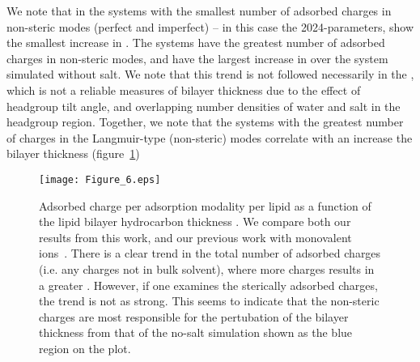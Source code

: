 We note that in the systems with the smallest number of adsorbed charges in non-steric modes (perfect and imperfect) -- in this case the 2024-\mg parameters, show 
the smallest increase in \dc{}. The  systems have the greatest number of adsorbed charges in non-steric modes, 
and have the largest increase in \dc{} over the system simulated without salt. We note that
this trend is not followed necessarily in the \dhh{}, which is not a reliable measures of bilayer thickness due to the effect of headgroup tilt angle, and overlapping number densities of water
and salt in the headgroup region.
Together, we note that the systems with the greatest number of charges in the Langmuir-type (non-steric) modes correlate with an increase the 
bilayer thickness (figure~\ref{figch4:chargeperlipid})
\begin{figure}[h!]
    \caption[Adsorbed charge per adsorption modality]{Adsorbed charge per adsorption modality per lipid as a function of the lipid bilayer hydrocarbon thickness \dc{}. We compare both our results from this work, and our previous work with monovalent
        ions~\cite{saunders:2024}. There is a clear trend in the total number of adsorbed
        charges (i.e. any charges not in bulk solvent), where more charges results in a greater \dc{}. However, if one examines the sterically adsorbed charges, the trend is not as strong. This seems to indicate
    that the non-steric charges are most responsible for the pertubation of the bilayer thickness from that of the no-salt simulation shown as the blue region on the plot.}
    \label{figch4:chargeperlipid}
    \texttt{[image: Figure\_6.eps]}
\end{figure}
